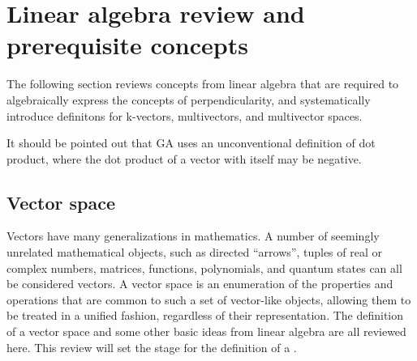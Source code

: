 \section{Linear algebra review and prerequisite concepts}

The following section reviews concepts from linear algebra that are required to algebraically express the concepts of perpendicularity, and systematically introduce definitons for k-vectors, multivectors, and multivector spaces.

It should be pointed out that GA uses an unconventional definition of dot product, where the dot product of a vector with itself may be negative.

\subsection{Vector space}

Vectors have many generalizations in mathematics.
A number of seemingly unrelated mathematical objects, such as
directed ``arrows'', tuples of real or complex numbers, matrices, functions, polynomials, and quantum states 
can all be considered vectors.
A vector space is an enumeration of the properties and operations that are common to such a set of
vector-like objects, allowing them to be treated in a unified fashion, regardless of their representation.
The definition of a vector space and some other basic ideas from linear algebra are all reviewed here.
This review will set the stage for the definition of a 
.


